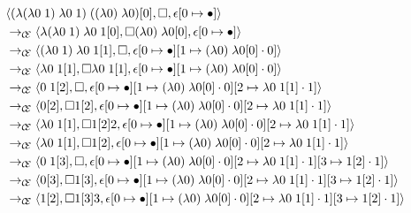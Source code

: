 \begin{figure}
\scriptsize
\begin{align*}
&\langle (\lambda(\lambda0\;1)\;\lambda0\;1)\;((\lambda0)\;\lambda0)[0],\square,\epsilon[0\mapsto\bullet]\rangle\\
&\rightarrow_{\mathcal{\mathcal{C} \mskip -4mu \mathcal{E}}}\langle \lambda(\lambda0\;1)\;\lambda0\;1[0],\square (\lambda0)\;\lambda0[0],\epsilon[0\mapsto\bullet]\rangle\\ 
&\rightarrow_{\mathcal{\mathcal{C} \mskip -4mu \mathcal{E}}}\langle (\lambda0\;1)\;\lambda0\;1[1],\square,\epsilon[0\mapsto\bullet][1\mapsto(\lambda0)\;\lambda0[0]\cdot0]\rangle\\ 
&\rightarrow_{\mathcal{\mathcal{C} \mskip -4mu \mathcal{E}}}\langle \lambda0\;1[1],\square \lambda0\;1[1],\epsilon[0\mapsto\bullet][1\mapsto(\lambda0)\;\lambda0[0]\cdot0]\rangle\\ 
&\rightarrow_{\mathcal{\mathcal{C} \mskip -4mu \mathcal{E}}}\langle 0\;1[2],\square,\epsilon[0\mapsto\bullet][1\mapsto(\lambda0)\;\lambda0[0]\cdot0][2\mapsto\lambda0\;1[1]\cdot1]\rangle\\ 
&\rightarrow_{\mathcal{\mathcal{C} \mskip -4mu \mathcal{E}}}\langle 0[2],\square 1[2],\epsilon[0\mapsto\bullet][1\mapsto(\lambda0)\;\lambda0[0]\cdot0][2\mapsto\lambda0\;1[1]\cdot1]\rangle\\ 
&\rightarrow_{\mathcal{\mathcal{C} \mskip -4mu \mathcal{E}}}\langle \lambda0\;1[1],\square 1[2] 2,\epsilon[0\mapsto\bullet][1\mapsto(\lambda0)\;\lambda0[0]\cdot0][2\mapsto\lambda0\;1[1]\cdot1]\rangle\\ 
&\rightarrow_{\mathcal{\mathcal{C} \mskip -4mu \mathcal{E}}}\langle \lambda0\;1[1],\square 1[2],\epsilon[0\mapsto\bullet][1\mapsto(\lambda0)\;\lambda0[0]\cdot0][2\mapsto\lambda0\;1[1]\cdot1]\rangle\\ 
&\rightarrow_{\mathcal{\mathcal{C} \mskip -4mu \mathcal{E}}}\langle 0\;1[3],\square,\epsilon[0\mapsto\bullet][1\mapsto(\lambda0)\;\lambda0[0]\cdot0][2\mapsto\lambda0\;1[1]\cdot1][3\mapsto1[2]\cdot1]\rangle\\ 
&\rightarrow_{\mathcal{\mathcal{C} \mskip -4mu \mathcal{E}}}\langle 0[3],\square 1[3],\epsilon[0\mapsto\bullet][1\mapsto(\lambda0)\;\lambda0[0]\cdot0][2\mapsto\lambda0\;1[1]\cdot1][3\mapsto1[2]\cdot1]\rangle\\ 
&\rightarrow_{\mathcal{\mathcal{C} \mskip -4mu \mathcal{E}}}\langle 1[2],\square 1[3] 3,\epsilon[0\mapsto\bullet][1\mapsto(\lambda0)\;\lambda0[0]\cdot0][2\mapsto\lambda0\;1[1]\cdot1][3\mapsto1[2]\cdot1]\rangle\\ 

\end{align*}
\end{figure}
